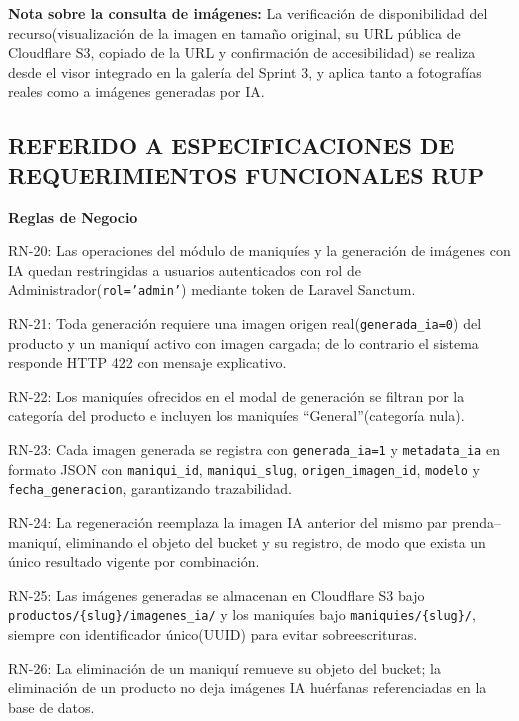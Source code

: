 \documentclass[12pt,a4paper]{article}
\begin{document}
\vspace{0.3em}

\textbf{Nota sobre la consulta de imágenes:} La verificación de disponibilidad del recurso(visualización de la imagen en tamaño original, su URL pública de Cloudflare S3, copiado de la URL y confirmación de accesibilidad) se realiza desde el visor integrado en la galería del Sprint 3, y aplica tanto a fotografías reales como a imágenes generadas por IA.

\subsection*{REFERIDO A ESPECIFICACIONES DE REQUERIMIENTOS FUNCIONALES RUP}

\textbf{Reglas de Negocio}

RN-20: Las operaciones del módulo de maniquíes y la generación de imágenes con IA quedan restringidas a usuarios autenticados con rol de Administrador(\texttt{rol='admin'}) mediante token de Laravel Sanctum.

RN-21: Toda generación requiere una imagen origen real(\texttt{generada\_ia=0}) del producto y un maniquí activo con imagen cargada; de lo contrario el sistema responde HTTP 422 con mensaje explicativo.

RN-22: Los maniquíes ofrecidos en el modal de generación se filtran por la categoría del producto e incluyen los maniquíes ``General''(categoría nula).

RN-23: Cada imagen generada se registra con \texttt{generada\_ia=1} y \texttt{metadata\_ia} en formato JSON con \texttt{maniqui\_id}, \texttt{maniqui\_slug}, \texttt{origen\_imagen\_id}, \texttt{modelo} y \texttt{fecha\_generacion}, garantizando trazabilidad.

RN-24: La regeneración reemplaza la imagen IA anterior del mismo par prenda--maniquí, eliminando el objeto del bucket y su registro, de modo que exista un único resultado vigente por combinación.

RN-25: Las imágenes generadas se almacenan en Cloudflare S3 bajo \texttt{productos/\{slug\}/imagenes\_ia/} y los maniquíes bajo \texttt{maniquies/\{slug\}/}, siempre con identificador único(UUID) para evitar sobreescrituras.

RN-26: La eliminación de un maniquí remueve su objeto del bucket; la eliminación de un producto no deja imágenes IA huérfanas referenciadas en la base de datos.
\end{document}
